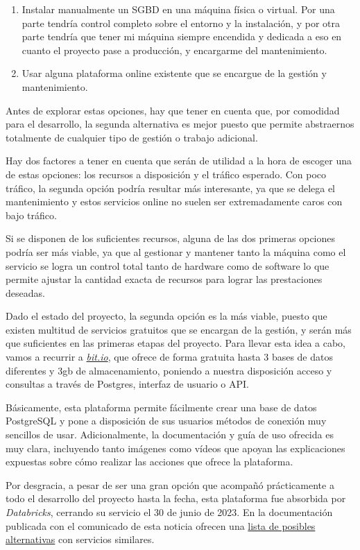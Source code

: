 \begin{enumerate}
    \item Instalar manualmente un SGBD en una máquina física o virtual. Por una parte tendría control completo sobre el entorno y la instalación, y por otra parte tendría que tener mi máquina siempre encendida y dedicada a eso en cuanto el proyecto pase a producción, y encargarme del mantenimiento.
    \item Usar alguna plataforma online existente que se encargue de la gestión y mantenimiento.
\end{enumerate}

Antes de explorar estas opciones, hay que tener en cuenta que, por comodidad para el desarrollo, la segunda alternativa es mejor puesto que permite abstraernos totalmente de cualquier tipo de gestión o trabajo adicional.

Hay dos factores a tener en cuenta que serán de utilidad a la hora de escoger una de estas opciones: los recursos a disposición y el tráfico esperado. Con poco tráfico, la segunda opción podría resultar más interesante, ya que se delega el mantenimiento y estos servicios online no suelen ser extremadamente caros con bajo tráfico.

Si se disponen de los suficientes recursos, alguna de las dos primeras opciones podría ser más viable, ya que al gestionar y mantener tanto la máquina como el servicio se logra un control total tanto de hardware como de software lo que permite ajustar la cantidad exacta de recursos para lograr las prestaciones deseadas.

Dado el estado del proyecto, la segunda opción es la más viable, puesto que existen multitud de servicios gratuitos que se encargan de la gestión, y serán más que suficientes en las primeras etapas del proyecto. Para llevar esta idea a cabo, vamos a recurrir a \href{https://bit.io/}{\textit{bit.io}}, que ofrece de forma gratuita hasta 3 bases de datos diferentes y 3gb de almacenamiento, poniendo a nuestra disposición acceso y consultas a través de Postgres, interfaz de usuario o API.

Básicamente, esta plataforma permite fácilmente crear una base de datos PostgreSQL y pone a disposición de sus usuarios métodos de conexión muy sencillos de usar. Adicionalmente, la documentación y guía de uso ofrecida es muy clara, incluyendo tanto imágenes como vídeos que apoyan las explicaciones expuestas sobre cómo realizar las acciones que ofrece la plataforma.

Por desgracia, a pesar de ser una gran opción que acompañó prácticamente a todo el desarrollo del proyecto hasta la fecha, esta plataforma fue absorbida por \textit{Databricks}, cerrando su servicio el 30 de junio de 2023. En la documentación publicada con el comunicado de esta noticia ofrecen una \href{https://docs.bit.io/docs/sunset#alternative-postgres-providers}{lista de posibles alternativas} con servicios similares.

